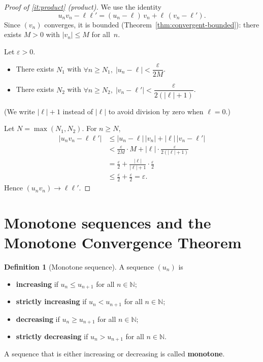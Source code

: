 \documentclass[12pt,a4paper,openany]{book}
\newcommand{\N}{\mathbb{N}}
\newcommand{\eps}{\varepsilon}
\newcommand{\abs}[1]{\left\lvert #1 \right\rvert}
\theoremstyle{definition}
\newtheorem{definition}{Definition}[chapter]
\theoremstyle{remark}
\begin{document}
\begin{proof}[Proof of \ref{it:product} (product)]
We use the identity
\[
   u_n v_n - \ell\ell'
   = (u_n - \ell)\,v_n + \ell\,(v_n - \ell').
\]
Since $(v_n)$ converges, it is bounded (Theorem~\ref{thm:convergent-bounded}):
there exists $M > 0$ with $\abs{v_n} \leq M$ for all~$n$.

Let $\eps > 0$.
\begin{itemize}
\item There exists $N_1$ with $\forall n \geq N_1,\;
      \abs{u_n - \ell} < \dfrac{\eps}{2M}$.
\item There exists $N_2$ with $\forall n \geq N_2,\;
      \abs{v_n - \ell'} < \dfrac{\eps}{2(\abs{\ell} + 1)}$.
\end{itemize}
(We write $\abs{\ell}+1$ instead of $\abs{\ell}$ to avoid division by zero
when $\ell = 0$.)

Let $N = \max(N_1, N_2)$. For $n \geq N$,
\begin{align*}
   \abs{u_n v_n - \ell\ell'}
   &\leq \abs{u_n - \ell}\,\abs{v_n} + \abs{\ell}\,\abs{v_n - \ell'} \\
   &< \frac{\eps}{2M}\cdot M + \abs{\ell}\cdot\frac{\eps}{2(\abs{\ell}+1)} \\
   &= \frac{\eps}{2} + \frac{\abs{\ell}}{\abs{\ell}+1}\cdot\frac{\eps}{2} \\
   &\leq \frac{\eps}{2} + \frac{\eps}{2} = \eps.
\end{align*}
Hence $(u_n v_n) \to \ell\ell'$.
\end{proof}

\section{Monotone sequences and the Monotone Convergence Theorem}
\label{sec:monotone}

\begin{definition}[Monotone sequence]\label{def:monotone}
A sequence $(u_n)$ is
\begin{itemize}
\item \textbf{increasing} if
      $u_n \leq u_{n+1}$ for all $n \in \N$;
\item \textbf{strictly increasing} if $u_n < u_{n+1}$ for all $n \in \N$;
\item \textbf{decreasing} if
      $u_n \geq u_{n+1}$ for all $n \in \N$;
\item \textbf{strictly decreasing} if $u_n > u_{n+1}$ for all $n \in \N$.
\end{itemize}
A sequence that is either increasing or decreasing is called \textbf{monotone}.
\end{definition}
\end{document}
